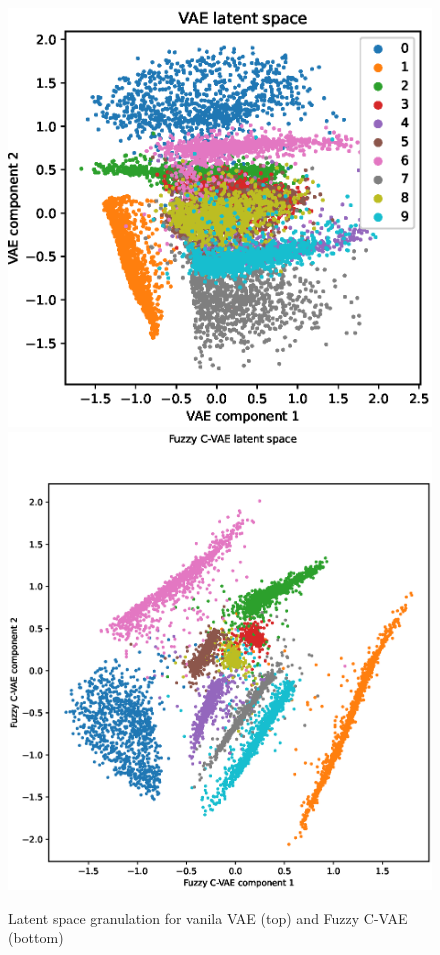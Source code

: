 \documentclass[runningheads]{llncs}
\begin{document}
\begin{figure}
    \centering
    \includegraphics[width=1\textwidth]{fig2a-vae-all-features.eps}
    \includegraphics[width=1\textwidth]{fig2b-fcvae-all-features.eps}
    
    \caption{Latent space granulation for vanila VAE (top) and Fuzzy C-VAE (bottom)}
    \label{fig:clustering}
\end{figure}
\end{document}
